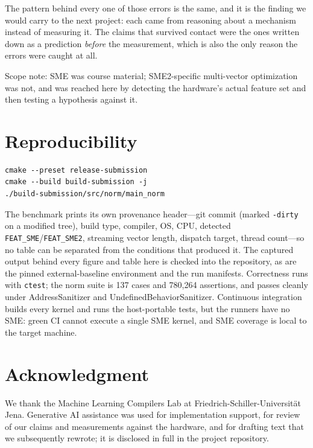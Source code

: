 \documentclass[conference,10pt]{IEEEtran}
\newcommand{\code}[1]{\texttt{\small #1}}
\begin{document}
The pattern behind every one of those errors is the same, and it is the finding
we would carry to the next project: each came from reasoning about a mechanism
instead of measuring it. The claims that survived contact were the ones written
down as a prediction \emph{before} the measurement, which is also the only
reason the errors were caught at all.

Scope note: SME was course material; SME2-specific multi-vector optimization was
not, and was reached here by detecting the hardware's actual feature set and
then testing a hypothesis against it.

\appendices

\section{Reproducibility}

\begin{verbatim}
cmake --preset release-submission
cmake --build build-submission -j
./build-submission/src/norm/main_norm
\end{verbatim}

The benchmark prints its own provenance header---git commit (marked
\code{-dirty} on a modified tree), build type, compiler, OS, CPU, detected
\code{FEAT\_SME}/\code{FEAT\_SME2}, streaming vector length, dispatch target,
thread count---so no table can be separated from the conditions that produced
it. The captured output behind every figure and table here is checked into the
repository, as are the pinned external-baseline environment and the run
manifests. Correctness runs with \code{ctest}; the norm suite is 137 cases and
780{,}264 assertions, and passes cleanly under AddressSanitizer and
UndefinedBehaviorSanitizer. Continuous integration builds every kernel and runs
the host-portable tests, but the runners have no SME: green CI cannot execute a
single SME kernel, and SME coverage is local to the target machine.

\section*{Acknowledgment}

We thank the Machine Learning Compilers Lab at Friedrich-Schiller-Universit\"at
Jena. Generative AI assistance was used for implementation support, for review
of our claims and measurements against the hardware, and for drafting text that
we subsequently rewrote; it is disclosed in full in the project repository.
\end{document}
